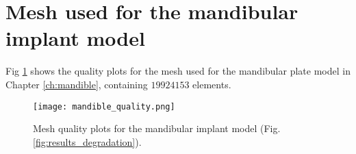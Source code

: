 \section{Mesh used for the mandibular implant model}

Fig \ref{fig:appendix_mandible} shows the quality plots for the mesh used for the mandibular plate model in Chapter \ref{ch:mandible}, containing $\num{19924153}$ elements.

\begin{figure}[!h]
\centering
\medskip
\texttt{[image: mandible\_quality.png]}
\caption[Mesh quality plots for the mandibular implant model]{Mesh quality plots for the mandibular implant model (Fig. \ref{fig:results_degradation}).} \label{fig:appendix_mandible}
\end{figure}

\cleardoublepage

